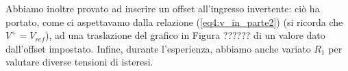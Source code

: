 
Abbiamo inoltre provato ad inserire un offset all'ingresso invertente: ciò ha portato, come ci aspettavamo dalla relazione (\ref{eq4:v_in_parte2}) (si ricorda che $V^+=V_{ref}$), ad una traslazione del grafico in Figura ?????? di un valore dato dall'offset impostato. Infine, durante l'esperienza, abbiamo anche variato $R_1$ per valutare diverse tensioni di isteresi.